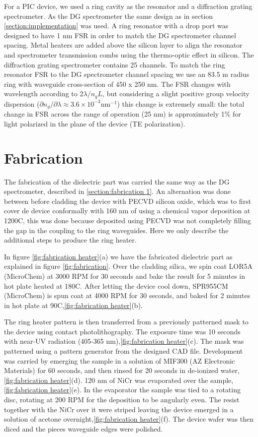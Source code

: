 \documentclass[12pt,twoside,english]{book}
\renewcommand{\~}{\perispomeni}%
\DeclareRobustCommand{\textgreek}[1]{\leavevmode{\greektext #1}}
\numberwithin{equation}{section}
\numberwithin{figure}{section}
\begin{document}
For a PIC device, we used a ring cavity as the resonator and a diffraction grating spectrometer.  As the DG spectrometer the same design as in section \ref{section:implementation} was used. A ring resonator with a drop port was designed to have 1 nm FSR in order to match the DG spectrometer channel spacing. Metal heaters are added above the silicon layer to align the resonator and spectrometer transmission combs using the thermo-optic effect in silicon. The diffraction grating spectrometer contains 25 channels. To match the ring resonator FSR to the DG spectrometer channel spacing we use an 83.5 \textgreek{m}m radius ring with waveguide cross-section of 450 x 250 nm. The FSR changes with wavelength according to $2\lambda/n_{g}L$, but considering a slight positive group velocity dispersion ($\partial n_{g}/\partial\lambda\approx3.6\times10^{-3}\text{nm}^{-1}$) this change is extremely small: the total change in FSR across the range of operation (25 nm) is approximately 1\% for light polarized in the plane of the device (TE polarization).

\section{Fabrication}

The fabrication of the dielectric part was carried the same way as the DG spectrometer, described in \ref{section:fabrication 1}. An alternation was done between before cladding the device with PECVD silicon oxide, which was to first cover de device conformally with 160 nm of  using a chemical vapor deposition at 1200\textdegree C, this was done because  deposited using PECVD was not completely filling the gap in the coupling to the ring waveguides. Here we only describe the additional steps to produce the ring heater.

In figure \ref{fig:fabrication heater}(a) we have the fabricated dielectric part as explained in figure \ref{fig:fabrication}. Over the cladding silica, we spin coat LOR5A (MicroChem) at 3000 RPM for 30 seconds and bake the result for 5 minutes in hot plate heated at 180\textdegree C. After letting the device cool down, SPR955CM (MicroChem) is spun coat at 4000 RPM for 30 seconds, and baked for 2 minutes in hot plate at 90\textdegree C,\ref{fig:fabrication heater}(b).

The ring heater pattern is then transferred from a previously patterned mask to the device using contact photolithography. The exposure time was 10 seconds with near-UV radiation (405-365 nm),\ref{fig:fabrication heater}(c). The mask was patterned using a pattern generator from the designed CAD file. Development was carried by emerging the sample in a solution of MIF300 (AZ Electronic Materials) for 60 seconds, and then rinsed for 20 seconds in de-ionized water,\ref{fig:fabrication heater}(d). 120 nm of NiCr was evaporated over the sample,\ref{fig:fabrication heater}(e). In the evaporator the sample was tied to a rotating disc, rotating at 200 RPM for the deposition to be angularly even. The resist together with the NiCr over it were striped leaving the device emerged in a solution of acetone overnight,\ref{fig:fabrication heater}(f). The device wafer was then diced and the pieces waveguide edges were polished.
\end{document}
